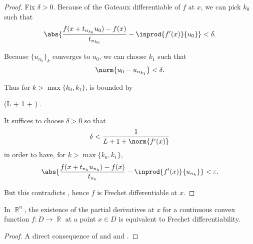 \begin{proof}
  Fix \( \delta > 0 \). Because of the Gateaux differentiable of \( f \) at \( x \), we can pick \( k_0 \) such that
  \begin{equation*}
    \abs{\frac {f(x + t_{n_{k_0}} u_0) - f(x)} {t_{n_{k_0}}} - \inprod{f'(x)} {u_0}} < \delta.
  \end{equation*}

  Because \( \{ u_{n_k} \}_k \) converges to \( u_0 \), we can choose \( k_1 \) such that
  \begin{equation*}
    \norm{u_0 - u_{n_{k_1}}} < \delta.
  \end{equation*}

  Thus for \( k > \max \{ k_0, k_1 \} \),  is bounded by
  \begin{balign*}
    \leq
    (L + 1 + ) \delta.
  \end{balign*}

  It suffices to choose \( \delta > 0 \) so that
  \begin{equation*}
    \delta < \frac 1 {L + 1 + \norm{f'(x)}}
  \end{equation*}
  in order to have, for \( k > \max \{ k_0, k_1 \} \),
  \begin{equation*}
    \abs{\frac {f(x + t_{n_k} u_{n_k}) - f(x)} {t_{n_k}} - \inprod{f'(x)} {u_{n_k}}} < \varepsilon.
  \end{equation*}

  But this contradicts , hence \( f \) is Frechet differentiable at \( x \).
\end{proof}

\begin{corollary}\label{thm:rn_continuous_convex_partial_derivatives_imply_frechet}
  In \( \BbbR^n \), the existence of the partial derivatives at \( x \) for a continuous convex function \( f: D \to \BbbR \) at a point \( x \in D \) is equivalent to Frechet differentiability.
\end{corollary}
\begin{proof}
  A direct consequence of and  and .
\end{proof}

